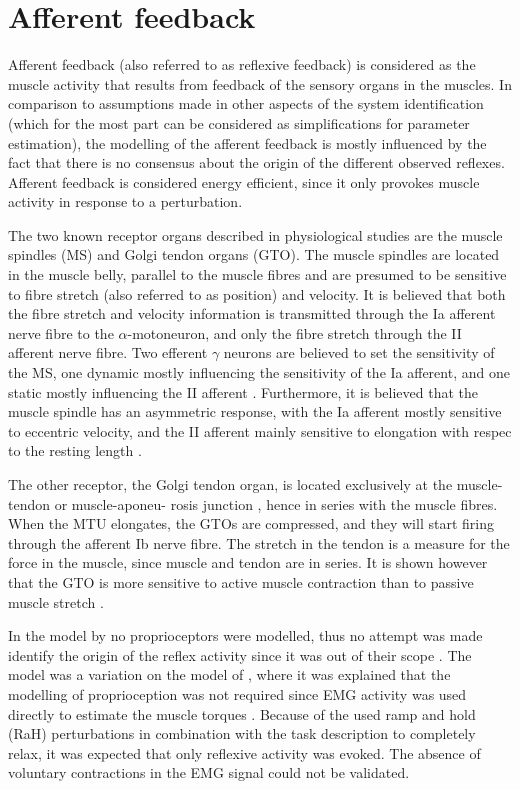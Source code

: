 \section{Afferent feedback} \label{sec:ass_afferent}
Afferent feedback (also referred to as reflexive feedback) is considered as the muscle activity that results from feedback of the sensory organs in the muscles. In comparison to assumptions made in other aspects of the system identification (which for the most part can be considered as simplifications for parameter estimation), the modelling of the afferent feedback is mostly influenced by the fact that there is no consensus about the origin of the different observed reflexes. Afferent feedback is considered energy efficient, since it only provokes muscle activity in response to a perturbation. 

The two known receptor organs described in physiological studies are the muscle spindles (MS) and Golgi tendon organs (GTO). The muscle spindles are located in the muscle belly, parallel to the muscle fibres and are presumed to be sensitive to fibre stretch (also referred to as position) and velocity. It is believed that both the fibre stretch and velocity information is transmitted through the Ia afferent nerve fibre to the $\alpha$-motoneuron, and only the fibre stretch through the II afferent nerve fibre. Two efferent $\gamma$ neurons are believed to set the sensitivity of the MS, one dynamic mostly influencing the sensitivity of the Ia afferent, and one static mostly influencing the II afferent \cite{mileusnic_mathematical_2006}. Furthermore, it is believed that the muscle spindle has an asymmetric response, with the Ia afferent mostly sensitive to eccentric velocity, and the II afferent mainly sensitive to elongation with respec to the resting length \cite{burke_muscle_1978}. 

The other receptor, the Golgi tendon organ, is located exclusively at the muscle-tendon or muscle-aponeu- rosis junction \cite{jami_golgi_1992}, hence in series with the muscle fibres. When the MTU elongates, the GTOs are compressed, and they will start firing through the afferent Ib nerve fibre. The stretch in the tendon is a measure for the force in the muscle, since muscle and tendon are in series. It is shown however that the GTO is more sensitive to active muscle contraction than to passive muscle stretch \cite{houk_responses_1967}.

In the model by \citeauthor{de_gooijer-van_de_groep_estimation_2016} no proprioceptors were modelled, thus no attempt was made identify the origin of the reflex activity since it was out of their scope \cite{de_gooijer-van_de_groep_estimation_2016}. The model was a variation on the model of \citeauthor{de_vlugt_relation_2010}, where it was explained that the modelling of proprioception was not required since EMG activity was used directly to estimate the muscle torques \cite{de_vlugt_relation_2010}. Because of the used ramp and hold (RaH) perturbations in combination with the task description to completely relax, it was expected that only reflexive activity was evoked. The absence of voluntary contractions in the EMG signal could not be validated. 


